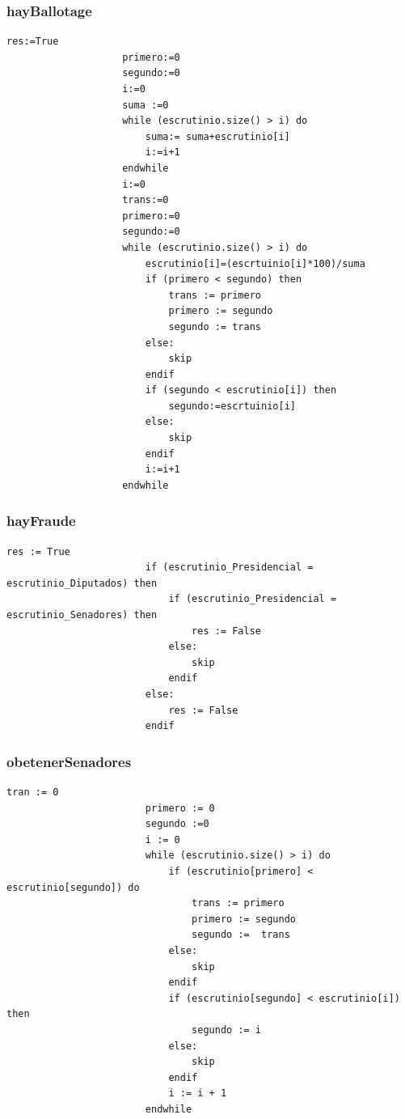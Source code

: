 \documentclass[10pt,a4paper]{article}
\begin{document}
		\subsubsection{hayBallotage}
			\begin{minipage}[t]{\textwidth}
				\begin{lstlisting}[caption={()},label=code:for]
					res:=True
					primero:=0
					segundo:=0
					i:=0
					suma :=0
					while (escrutinio.size() > i) do
						suma:= suma+escrutinio[i]
						i:=i+1
					endwhile
					i:=0
					trans:=0
					primero:=0
					segundo:=0	
					while (escrutinio.size() > i) do
						escrutinio[i]=(escrtuinio[i]*100)/suma
						if (primero < segundo) then
							trans := primero
							primero := segundo
							segundo := trans
						else:
							skip
						endif
						if (segundo < escrutinio[i]) then
							segundo:=escrtuinio[i]
						else:
							skip
						endif
						i:=i+1
					endwhile
				\end{lstlisting}
			\end{minipage}

		\subsubsection{hayFraude}
			\begin{minipage}[t]{\textwidth}
				\begin{lstlisting}[caption={()},label=code:for]
						res := True
						if (escrutinio_Presidencial = escrutinio_Diputados) then 
							if (escrutinio_Presidencial = escrutinio_Senadores) then 
								res := False
							else:
								skip
							endif
						else:
							res := False
						endif
				\end{lstlisting}
			\end{minipage}

		\subsubsection{obetenerSenadores}
			\begin{minipage}[t]{\textwidth}
				\begin{lstlisting}[caption={()},label=code:for]
						tran := 0
						primero := 0
						segundo :=0
						i := 0
						while (escrutinio.size() > i) do
							if (escrutinio[primero] < escrutinio[segundo]) do
								trans := primero
								primero := segundo
								segundo :=  trans
							else:
								skip
							endif
							if (escrutinio[segundo] < escrutinio[i]) then
								segundo := i
							else:
								skip
							endif
							i := i + 1
						endwhile
		
				\end{lstlisting}
			\end{minipage}
\end{document}
